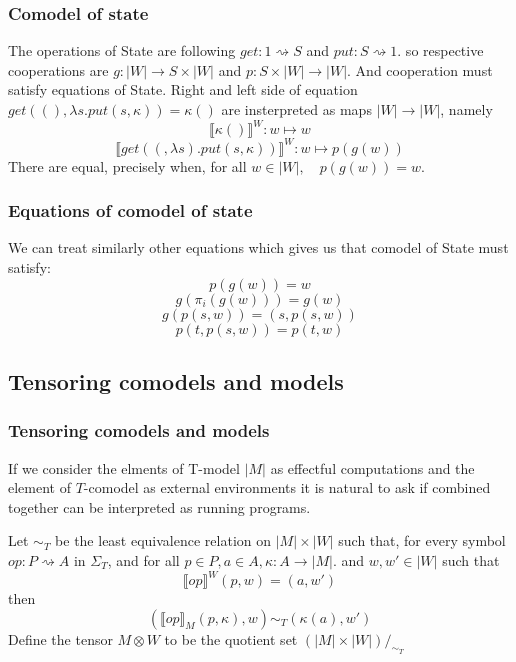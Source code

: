 \documentclass{beamer}
\begin{document}
\begin{frame}
    \frametitle{Comodel of state}
    The operations of State are following $get : 1 \rightsquigarrow S$ and $put: S \rightsquigarrow 1$.
    so respective cooperations are $g: |W| \rightarrow S \times |W|$ and $p : S \times |W| \rightarrow |W|$.
    And cooperation must satisfy equations of State.
    Right and left side of equation $get((), \lambda s . put(s, \kappa)) = \kappa ()$  are 
    insterpreted as maps $|W| \rightarrow |W|$, namely 
    \[
      \llbracket \kappa () \rrbracket^W : w \mapsto w
    \]
    \[
      \llbracket get((, \lambda s). put(s, \kappa)) \rrbracket^W : w \mapsto p(g(w))   
    \]
    There are equal, precisely when, for all $w \in |W|, \quad p(g(w)) = w$.
    
 

\end{frame}
\begin{frame}
    \frametitle{Equations of comodel of state}
    We can treat similarly other equations which gives us that comodel of State must satisfy:
    \[
        p(g(w)) = w
    \]
    \[
      g(\pi_i(g(w))) = g(w)  
    \]
    \[
        g(p(s,w)) = (s, p(s,w))
    \]
    \[
      p(t, p(s,w)) = p(t, w)  
    \]

    

\end{frame}

\subsection{Tensoring comodels and models}

\begin{frame}
    \frametitle{Tensoring comodels and models}
    If we consider the elments of T-model $|M|$ as effectful computations and the element of $T$-comodel as 
    external environments it is natural to ask if combined together can be interpreted as running programs.
    
    Let $\sim_T$ be the least equivalence relation on $|M| \times |W|$
    such that, for every symbol $op : P \rightsquigarrow A$ in $\Sigma_T$, 
    and for all $p \in P, a \in A, \kappa : A \rightarrow |M|$. and $w, w' \in |W|$ 
    such that    \[
        \llbracket op \rrbracket^W    (p, w) = (a, w')
    \] then 
    \[
        (\llbracket op\rrbracket_M (p,\kappa), w)   \sim_T (\kappa(a), w')
    \]
    Define the tensor $M \otimes W$ to be the quotient set $(|M| \times |W|)/_{\sim_T}$
    
    
    

\end{frame}
\end{document}
